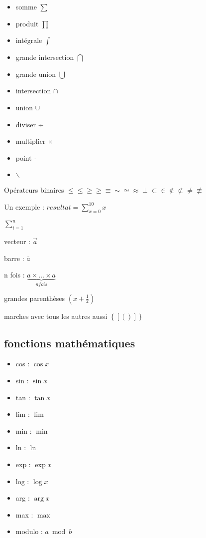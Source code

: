 \begin{itemize}
	\item somme $\sum$
	\item produit $\prod$
	\item intégrale $\int$
	\item grande intersection $\bigcap$
	\item grande union $\bigcup$
	\item intersection $\cap$
	\item union $\cup$
	\item diviser $\div$
	\item multiplier $\times$
	\item point $\cdot$
	\item $\backslash$
\end{itemize}

Opérateurs binaires $\leq \le \geq \ge \equiv \sim \simeq \approx \perp \subset \in \not\in \not\subset \not= \not\equiv$

Un exemple : $resultat = \sum_{x=0}^{10} x$


$\displaystyle\sum\nolimits_{i=1}^n $

vecteur : $\overrightarrow{a}$

barre : $\overline{a}$

n fois : $\underbrace{a \times \dots \times a}_{n fois}$

grandes parenthèses $\left( x + \frac{1}{2} \right)$

marches avec tous les autres aussi $\left\{ \left [ \left(  \right) \right] \right\}$


\subsection{fonctions mathématiques}

\begin{itemize}
	\item cos : $\cos x$
	\item sin : $\sin x$
	\item tan : $\tan x$
	\item lim : $\lim$
	\item min : $\min$
	\item ln : $\ln $
	\item exp : $\exp x$
	\item log : $\log x$
	\item arg : $\arg x$
	\item max : $\max$
	\item modulo : $a \bmod b$
\end{itemize}


